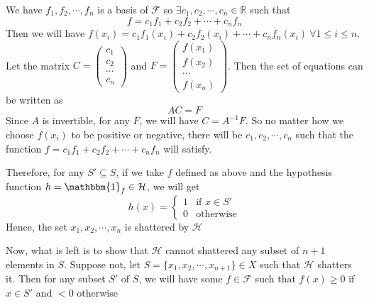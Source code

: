 \documentclass{article}
\begin{document}
We have ${f_1,f_2,\cdots,f_n}$ is a basis of $\mathcal{F}$ so $\exists c_1,c_2,\cdots,c_n \in \mathbb{R}$ such that
$$f = c_1f_1+c_2f_2+\cdots+c_nf_n$$
Then we will have $f(x_i)=c_1f_1(x_i)+c_2f_2(x_i)+\cdots+c_nf_n(x_i) \ \forall 1 \leq i \leq n$. Let the matrix $C=\begin{pmatrix}
c_1\\
c_2\\
\cdots \\
c_n
\end{pmatrix}$ and $F=\begin{pmatrix}
f(x_1)\\
f(x_2)\\
\cdots\\
f(x_n)
\end{pmatrix}$. Then the set of equations can be written as
$$AC=F$$
Since $A$ is invertible, for any $F$, we will have $C=A^{-1}F$. So no matter how we choose $f(x_i)$ to be positive or negative, there will be $c_1,c_2,\cdots,c_n$ such that the function $f=c_1f_1+c_2f_2+\cdots+c_nf_n$ will satisfy.

Therefore, for any $S' \subseteq S$, if we take $f$ defined as above and the hypothesis function $h=\mathbbm{1}_f \in \mathcal{H}$, we will get
$$h(x) = \begin{cases}
1 & \text{if $x \in S'$}\\
0 & \text{otherwise}
\end{cases}$$
Hence, the set $x_1,x_2,\cdots,x_n$ is shattered by $\mathcal{H}$

Now, what is left is to show that $\mathcal{H}$ cannot shattered any subset of $n+1$ elements in $S$. Suppose not, let $S=\{x_1,x_2,\cdots,x_{n+1}\} \in X$ such that $\mathcal{H}$ shatters it. Then for any subset $S'$ of $S$, we will have some $f \in \mathcal{F}$ such that $f(x) \geq 0$ if $x \in S'$ and $< 0$ otherwise
\end{document}
